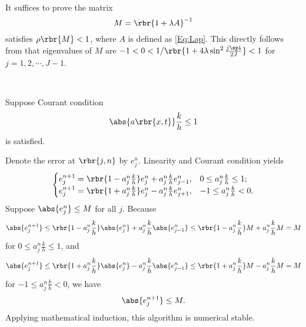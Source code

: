 \documentclass[english, nochinese]{pkupaper}
\begin{document}
\begin{thmquestion}
\ 
\begin{thmproof}
It suffices to prove the matrix
\begin{equation}
M = \rbr{ 1 + \lambda A }^{-1}
\end{equation}
satisfies $ \rho \rbr{M} < 1 $, where $A$ is defined as \eqref{Eq:Lap}. This directly follows from that eigenvalues of $M$ are $ -1 < 0 < 1 / \rbr{ 1 + 4 \lambda \sin^2 \frac{ j \spi }{ 2 J } } < 1 $ for $ j = 1, 2, \cdots, J - 1 $.

\sqed
\end{thmproof}
\end{thmquestion}

\begin{thmquestion}
\ 
\begin{thmproof}
Suppose Courant condition
\begin{equation}
\abs{ a \rbr{ x, t } } \frac{k}{h} \le 1
\end{equation}
is satisfied.

Denote the error at $ \rbr{ j, n } $ by $e_j^n$. Linearity and Courant condition yields
\begin{equation}
\begin{cases}
e_j^{ n + 1 } = \rbr{ 1 - a_j^n \frac{k}{h} } e_j^n + a_j^n \frac{k}{h} e_{ j - 1 }^n, & 0 \le a_j^n \frac{k}{h} \le 1; \\
e_j^{ n + 1 } = \rbr{ 1 + a_j^n \frac{k}{h} } e_j^n - a_j^n \frac{k}{h} e_{ j + 1 }^n, & -1 \le a_j^n \frac{k}{h} < 0.
\end{cases}
\end{equation}
Suppose $ \abs{e_j^n} \le M $ for all $j$. Because
\begin{equation}
\abs{e_j^{ n + 1 }} \le \rbr{ 1 - a_j^n \frac{k}{h} } \abs{e_j^n} + a_j^n \frac{k}{h} \abs{e_{ j - 1 }^n} \le \rbr{ 1 - a_j^n \frac{k}{h} } M + a_j^n \frac{k}{h} M = M
\end{equation}
for $ 0 \le a_j^n \frac{k}{h} \le 1 $, and
\begin{equation}
\abs{e_j^{ n + 1 }} \le \rbr{ 1 + a_j^n \frac{k}{h} } \abs{e_j^n} - a_j^n \frac{k}{h} \abs{e_{ j - 1 }^n} \le \rbr{ 1 + a_j^n \frac{k}{h} } M - a_j^n \frac{k}{h} M = M
\end{equation}
for $ -1 \le a_j^n \frac{k}{h} < 0 $, we have
\begin{equation}
\abs{e_j^{ n + 1 }} \le M.
\end{equation}
Applying mathematical induction, this algorithm is numerical stable.

\sqed
\end{thmproof}
\end{thmquestion}
\end{document}
